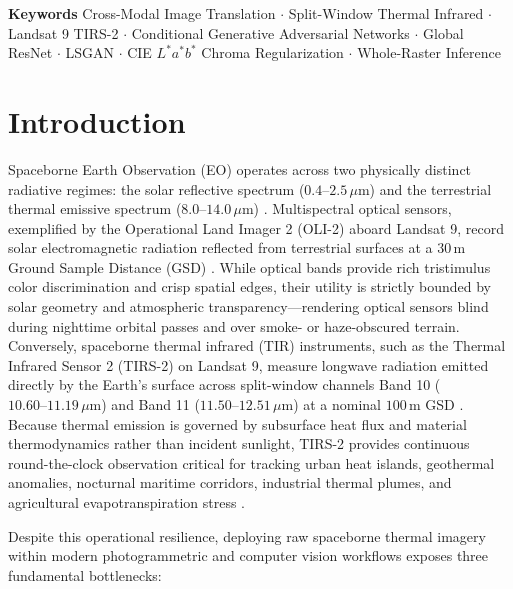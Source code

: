 \documentclass[10pt,a4paper,twoside]{article}
\begin{document}
\vspace{6pt}
\noindent\textbf{Keywords}\hspace{4pt} Cross-Modal Image Translation $\cdot$ Split-Window Thermal Infrared $\cdot$ Landsat 9 TIRS-2 $\cdot$ Conditional Generative Adversarial Networks $\cdot$ Global ResNet $\cdot$ LSGAN $\cdot$ CIE $L^*a^*b^*$ Chroma Regularization $\cdot$ Whole-Raster Inference

\section{Introduction}
Spaceborne Earth Observation (EO) operates across two physically distinct radiative regimes: the solar reflective spectrum ($0.4\text{--}2.5\,\mu\text{m}$) and the terrestrial thermal emissive spectrum ($8.0\text{--}14.0\,\mu\text{m}$) \cite{ref1}. Multispectral optical sensors, exemplified by the Operational Land Imager 2 (OLI-2) aboard Landsat 9, record solar electromagnetic radiation reflected from terrestrial surfaces at a $30\,\text{m}$ Ground Sample Distance (GSD) \cite{ref2}. While optical bands provide rich tristimulus color discrimination and crisp spatial edges, their utility is strictly bounded by solar geometry and atmospheric transparency---rendering optical sensors blind during nighttime orbital passes and over smoke- or haze-obscured terrain. Conversely, spaceborne thermal infrared (TIR) instruments, such as the Thermal Infrared Sensor 2 (TIRS-2) on Landsat 9, measure longwave radiation emitted directly by the Earth's surface across split-window channels Band 10 ($10.60\text{--}11.19\,\mu\text{m}$) and Band 11 ($11.50\text{--}12.51\,\mu\text{m}$) at a nominal $100\,\text{m}$ GSD \cite{ref2}. Because thermal emission is governed by subsurface heat flux and material thermodynamics rather than incident sunlight, TIRS-2 provides continuous round-the-clock observation critical for tracking urban heat islands, geothermal anomalies, nocturnal maritime corridors, industrial thermal plumes, and agricultural evapotranspiration stress \cite{ref3}.

Despite this operational resilience, deploying raw spaceborne thermal imagery within modern photogrammetric and computer vision workflows exposes three fundamental bottlenecks:
\end{document}

